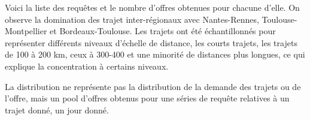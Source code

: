 \documentclass[
]{book}
\newenvironment{Shaded}{\begin{snugshade}}{\end{snugshade}}
\newcommand{\AttributeTok}[1]{\textcolor[rgb]{0.77,0.63,0.00}{#1}}
\newcommand{\ConstantTok}[1]{\textcolor[rgb]{0.00,0.00,0.00}{#1}}
\newcommand{\DecValTok}[1]{\textcolor[rgb]{0.00,0.00,0.81}{#1}}
\newcommand{\FunctionTok}[1]{\textcolor[rgb]{0.00,0.00,0.00}{#1}}
\newcommand{\NormalTok}[1]{#1}
\newcommand{\OtherTok}[1]{\textcolor[rgb]{0.56,0.35,0.01}{#1}}
\newcommand{\SpecialCharTok}[1]{\textcolor[rgb]{0.00,0.00,0.00}{#1}}
\newcommand{\StringTok}[1]{\textcolor[rgb]{0.31,0.60,0.02}{#1}}
\begin{document}
Voici la liste des requêtes et le nombre d'offres obtenues pour chacune d'elle. On observe la domination des trajet inter-régionaux avec Nantes-Rennes, Toulouse-Montpellier et Bordeaux-Toulouse. Les trajets ont été échantillonnés pour représenter différents niveaux d'échelle de distance, les courts trajets, les trajets de 100 à 200 km, ceux à 300-400 et une minorité de distances plus longues, ce qui explique la concentration à certains niveaux.

La distribution ne représente pas la distribution de la demande des trajets ou de l'offre, mais un pool d'offres obtenus pour une séries de requête relatives à un trajet donné, un jour donné.

\begin{Shaded}
\end{Shaded}
\end{document}
